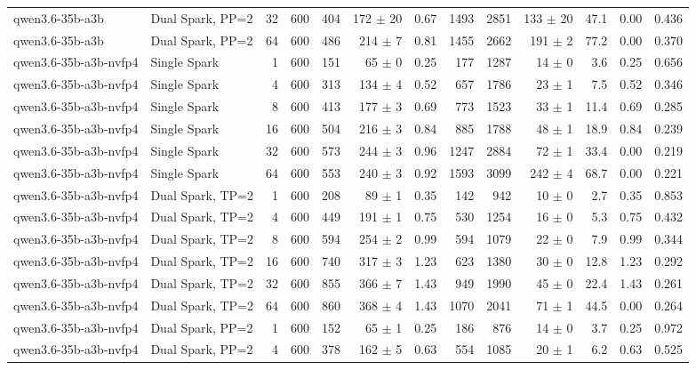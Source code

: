 \begin{tabular}{l l r r r r r r r r r r r}
qwen3.6-35b-a3b & Dual Spark, PP=2 & 32 & 600 & 404 & 172 $\pm$ 20 & 0.67 & 1493 & 2851 & 133 $\pm$ 20 & 47.1 & 0.00 & 0.436 \\
qwen3.6-35b-a3b & Dual Spark, PP=2 & 64 & 600 & 486 & 214 $\pm$ 7 & 0.81 & 1455 & 2662 & 191 $\pm$ 2 & 77.2 & 0.00 & 0.370 \\
\addlinespace
qwen3.6-35b-a3b-nvfp4 & Single Spark & 1 & 600 & 151 & 65 $\pm$ 0 & 0.25 & 177 & 1287 & 14 $\pm$ 0 & 3.6 & 0.25 & 0.656 \\
qwen3.6-35b-a3b-nvfp4 & Single Spark & 4 & 600 & 313 & 134 $\pm$ 4 & 0.52 & 657 & 1786 & 23 $\pm$ 1 & 7.5 & 0.52 & 0.346 \\
qwen3.6-35b-a3b-nvfp4 & Single Spark & 8 & 600 & 413 & 177 $\pm$ 3 & 0.69 & 773 & 1523 & 33 $\pm$ 1 & 11.4 & 0.69 & 0.285 \\
qwen3.6-35b-a3b-nvfp4 & Single Spark & 16 & 600 & 504 & 216 $\pm$ 3 & 0.84 & 885 & 1788 & 48 $\pm$ 1 & 18.9 & 0.84 & 0.239 \\
qwen3.6-35b-a3b-nvfp4 & Single Spark & 32 & 600 & 573 & 244 $\pm$ 3 & 0.96 & 1247 & 2884 & 72 $\pm$ 1 & 33.4 & 0.00 & 0.219 \\
qwen3.6-35b-a3b-nvfp4 & Single Spark & 64 & 600 & 553 & 240 $\pm$ 3 & 0.92 & 1593 & 3099 & 242 $\pm$ 4 & 68.7 & 0.00 & 0.221 \\
\addlinespace
qwen3.6-35b-a3b-nvfp4 & Dual Spark, TP=2 & 1 & 600 & 208 & 89 $\pm$ 1 & 0.35 & 142 & 942 & 10 $\pm$ 0 & 2.7 & 0.35 & 0.853 \\
qwen3.6-35b-a3b-nvfp4 & Dual Spark, TP=2 & 4 & 600 & 449 & 191 $\pm$ 1 & 0.75 & 530 & 1254 & 16 $\pm$ 0 & 5.3 & 0.75 & 0.432 \\
qwen3.6-35b-a3b-nvfp4 & Dual Spark, TP=2 & 8 & 600 & 594 & 254 $\pm$ 2 & 0.99 & 594 & 1079 & 22 $\pm$ 0 & 7.9 & 0.99 & 0.344 \\
qwen3.6-35b-a3b-nvfp4 & Dual Spark, TP=2 & 16 & 600 & 740 & 317 $\pm$ 3 & 1.23 & 623 & 1380 & 30 $\pm$ 0 & 12.8 & 1.23 & 0.292 \\
qwen3.6-35b-a3b-nvfp4 & Dual Spark, TP=2 & 32 & 600 & 855 & 366 $\pm$ 7 & 1.43 & 949 & 1990 & 45 $\pm$ 0 & 22.4 & 1.43 & 0.261 \\
qwen3.6-35b-a3b-nvfp4 & Dual Spark, TP=2 & 64 & 600 & 860 & 368 $\pm$ 4 & 1.43 & 1070 & 2041 & 71 $\pm$ 1 & 44.5 & 0.00 & 0.264 \\
\addlinespace
qwen3.6-35b-a3b-nvfp4 & Dual Spark, PP=2 & 1 & 600 & 152 & 65 $\pm$ 1 & 0.25 & 186 & 876 & 14 $\pm$ 0 & 3.7 & 0.25 & 0.972 \\
qwen3.6-35b-a3b-nvfp4 & Dual Spark, PP=2 & 4 & 600 & 378 & 162 $\pm$ 5 & 0.63 & 554 & 1085 & 20 $\pm$ 1 & 6.2 & 0.63 & 0.525 \\

\end{tabular}
